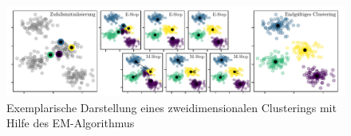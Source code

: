 \begin{figure}[H]
    \centering
    \includegraphics[width=\textwidth]{Bilder/expectation-maximization}
    \caption[Exemplarische Darstellung eines zweidimensionalen Clusterings mit Hilfe des EM-Algorithmus]{Exemplarische Darstellung eines zweidimensionalen Clusterings mit Hilfe des EM-Algorithmus \cite{VanderPlas2016}}\label{fig:k-means}
\end{figure}